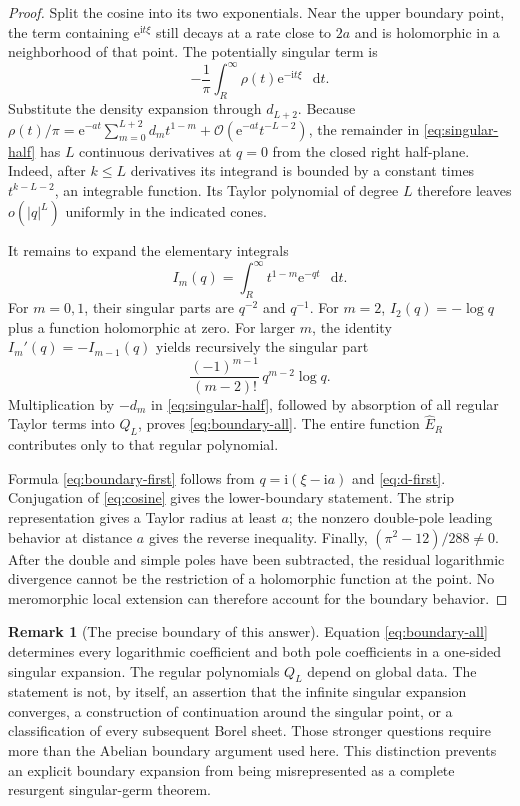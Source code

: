 \documentclass[11pt,a4paper]{article}
\theoremstyle{definition}
\newtheorem{remark}[theorem]{Remark}
\numberwithin{equation}{section}
\newcommand{\dd}{\mathop{}\!\mathrm{d}}
\newcommand{\ii}{\mathrm{i}}
\newcommand{\ee}{\mathrm{e}}
\newcommand{\Oh}{\mathcal O}
\begin{document}
\begin{proof}
Split the cosine into its two exponentials. Near the upper boundary point, the term containing $\ee^{\ii t\xi}$ still decays at a rate close to $2a$ and is holomorphic in a neighborhood of that point. The potentially singular term is
\begin{equation}
 -\frac1\pi\int_R^\infty\rho(t)\ee^{-\ii t\xi}\,\dd t.
 \label{eq:singular-half}
\end{equation}
Substitute the density expansion through $d_{L+2}$. Because
$\rho(t)/\pi=\ee^{-at}\sum_{m=0}^{L+2}d_mt^{1-m}
+\Oh(\ee^{-at}t^{-L-2})$, the remainder in \eqref{eq:singular-half} has $L$ continuous derivatives at $q=0$ from the closed right half-plane. Indeed, after $k\le L$ derivatives its integrand is bounded by a constant times $t^{k-L-2}$, an integrable function. Its Taylor polynomial of degree $L$ therefore leaves $o(|q|^L)$ uniformly in the indicated cones.

It remains to expand the elementary integrals
\[
 I_m(q)=\int_R^\infty t^{1-m}\ee^{-qt}\,\dd t.
\]
For $m=0,1$, their singular parts are $q^{-2}$ and $q^{-1}$. For $m=2$,
$I_2(q)=-\log q$ plus a function holomorphic at zero. For larger $m$, the identity $I_m'(q)=-I_{m-1}(q)$ yields recursively the singular part
\[
 \frac{(-1)^{m-1}}{(m-2)!}\,q^{m-2}\log q.
\]
Multiplication by $-d_m$ in \eqref{eq:singular-half}, followed by absorption of all regular Taylor terms into $Q_L$, proves \eqref{eq:boundary-all}. The entire function $\widehat E_R$ contributes only to that regular polynomial.

Formula \eqref{eq:boundary-first} follows from $q=\ii(\xi-\ii a)$ and \eqref{eq:d-first}. Conjugation of \eqref{eq:cosine} gives the lower-boundary statement. The strip representation gives a Taylor radius at least $a$; the nonzero double-pole leading behavior at distance $a$ gives the reverse inequality. Finally, $(\pi^2-12)/288\ne0$. After the double and simple poles have been subtracted, the residual logarithmic divergence cannot be the restriction of a holomorphic function at the point. No meromorphic local extension can therefore account for the boundary behavior.
\end{proof}

\begin{remark}[The precise boundary of this answer]
Equation \eqref{eq:boundary-all} determines every logarithmic coefficient and both pole coefficients in a one-sided singular expansion. The regular polynomials $Q_L$ depend on global data. The statement is not, by itself, an assertion that the infinite singular expansion converges, a construction of continuation around the singular point, or a classification of every subsequent Borel sheet. Those stronger questions require more than the Abelian boundary argument used here. This distinction prevents an explicit boundary expansion from being misrepresented as a complete resurgent singular-germ theorem.
\end{remark}
\end{document}

